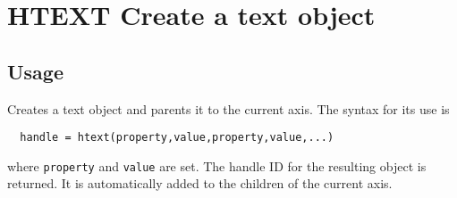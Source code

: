\section{HTEXT Create a text object}

\subsection{Usage}

Creates a text object and parents it to the current axis.  The
syntax for its use is 
\begin{verbatim}
  handle = htext(property,value,property,value,...)
\end{verbatim}
where \verb|property| and \verb|value| are set.  The handle ID for the
resulting object is returned.  It is automatically added to
the children of the current axis.
